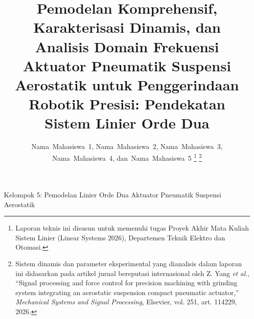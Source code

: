 \documentclass[journal]{IEEEtran}
\begin{document}
\title{Pemodelan Komprehensif, Karakterisasi Dinamis, dan Analisis Domain Frekuensi Aktuator Pneumatik Suspensi Aerostatik untuk Penggerindaan Robotik Presisi: Pendekatan Sistem Linier Orde Dua}

\author{Nama~Mahasiswa~1,
        Nama~Mahasiswa~2,
        Nama~Mahasiswa~3,
        Nama~Mahasiswa~4,
        dan~Nama~Mahasiswa~5%
\thanks{Laporan teknis ini disusun untuk memenuhi tugas Proyek Akhir Mata Kuliah Sistem Linier (Linear Systems 2026), Departemen Teknik Elektro dan Otomasi.}%
\thanks{Sistem dinamis dan parameter eksperimental yang dianalisis dalam laporan ini didasarkan pada artikel jurnal bereputasi internasional oleh Z. Yang \textit{et al.}, ``Signal processing and force control for precision machining with grinding system integrating an aerostatic suspension compact pneumatic actuator,'' \textit{Mechanical Systems and Signal Processing}, Elsevier, vol. 251, art. 114229, 2026.}%
}

%
{Kelompok 5: Pemodelan Linier Orde Dua Aktuator Pneumatik Suspensi Aerostatik}

\maketitle
\end{document}
